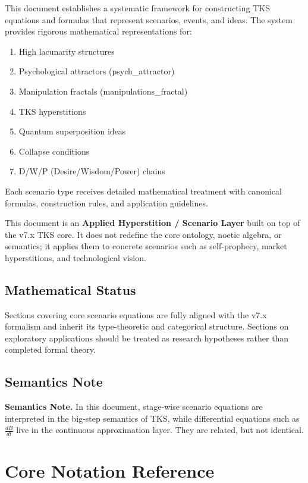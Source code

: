 \documentclass[11pt,twoside]{book}
\begin{document}
\begin{tcolorbox}[colback=blue!5!white,colframe=blue!75!black,title=\textbf{Purpose},breakable]
This document establishes a systematic framework for constructing TKS equations and formulas
that represent scenarios, events, and ideas. The system provides rigorous mathematical
representations for:
\begin{enumerate}
    \item High lacunarity structures
    \item Psychological attractors (psych\_attractor)
    \item Manipulation fractals (manipulations\_fractal)
    \item TKS hyperstitions
    \item Quantum superposition ideas
    \item Collapse conditions
    \item D/W/P (Desire/Wisdom/Power) chains
\end{enumerate}
Each scenario type receives detailed mathematical treatment with canonical formulas,
construction rules, and application guidelines.
\end{tcolorbox}

This document is an \textbf{Applied Hyperstition / Scenario Layer} built on top of the v7.x TKS core. It does not redefine the core ontology, noetic algebra, or semantics; it applies them to concrete scenarios such as self-prophecy, market hyperstitions, and technological vision.

\subsection*{Mathematical Status}
Sections covering core scenario equations are fully aligned with the v7.x formalism and inherit its type-theoretic and categorical structure. Sections on exploratory applications should be treated as research hypotheses rather than completed formal theory.

\subsection*{Semantics Note}
\textbf{Semantics Note.} In this document, stage-wise scenario equations are interpreted in the big-step semantics of TKS, while differential equations such as $\frac{dB}{dt}$ live in the continuous approximation layer. They are related, but not identical.

\section{Core Notation Reference}
\end{document}
